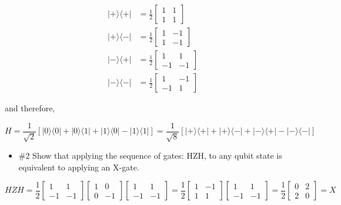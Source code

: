 \documentclass[11pt]{article}
\providecommand{\tightlist}{%
      \setlength{\itemsep}{0pt}\setlength{\parskip}{0pt}}
\begin{document}
\[
\begin{eqnarray}
|+\rangle \langle +| &= \frac{1}{2}
\begin{bmatrix}
1 & 1 \\
1 & 1
\end{bmatrix}\\
|+\rangle \langle -| &=\frac{1}{2}
\begin{bmatrix}
1 & -1 \\
1 & -1
\end{bmatrix}\\
|-\rangle \langle +| &= \frac{1}{2}
\begin{bmatrix}
1 & 1 \\
-1 & -1
\end{bmatrix}\\
|-\rangle \langle -| &= \frac{1}{2}
\begin{bmatrix}
1 & -1 \\
-1 & 1
\end{bmatrix}
\end{eqnarray}
\]

and therefore,

\[
H = \frac{1}{\sqrt{2}}\left[ |0\rangle \langle 0| 
+ |0\rangle \langle 1| + |1\rangle \langle 0| - |1\rangle \langle 1|\right]
=
\frac{1}{\sqrt{8}}\left[ |+\rangle \langle +| 
+ |+\rangle \langle -| + |-\rangle \langle +| - |-\rangle \langle -|\right]
\]

\begin{itemize}
\tightlist
\item
  \#2 Show that applying the sequence of gates: HZH, to any qubit state
  is equivalent to applying an X-gate.
\end{itemize}

\[
HZH = \frac{1}{2}
\begin{bmatrix}
1 & 1 \\
-1 & -1
\end{bmatrix}
\begin{bmatrix}
1 & 0 \\
0 & -1
\end{bmatrix}
\begin{bmatrix}
1 & 1 \\
-1 & -1
\end{bmatrix} 
= \frac{1}{2}
\begin{bmatrix}
1 & -1 \\
1 & 1
\end{bmatrix}
\begin{bmatrix}
1 & 1 \\
-1 & -1
\end{bmatrix} 
=\frac{1}{2}
\begin{bmatrix}
0 & 2 \\
2 & 0
\end{bmatrix}
= X
\]
\end{document}
